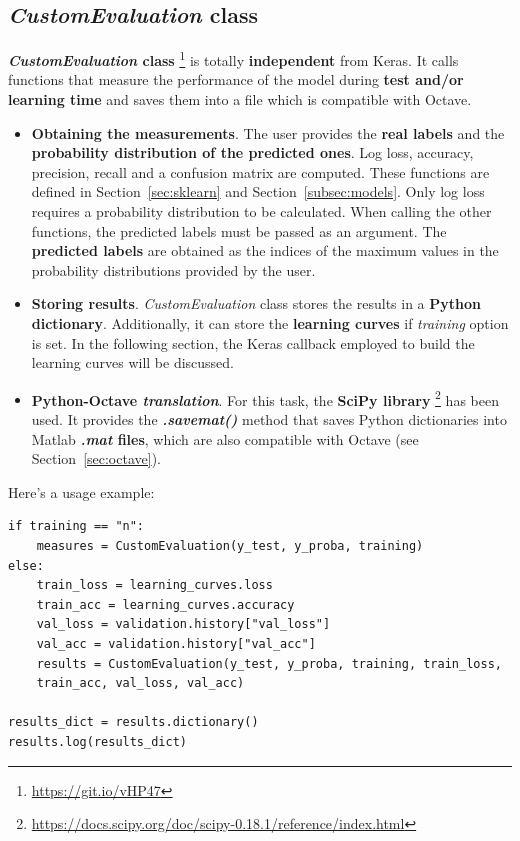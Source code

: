 \subsection{\textit{CustomEvaluation} class}
\textbf{\textit{CustomEvaluation} class} \footnote{\url{https://git.io/vHP47}} is totally \textbf{independent} from Keras. It calls functions that measure the performance of the model during \textbf{test and/or learning time} and saves them into a file which is compatible with Octave.
\begin{itemize}
	\item \textbf{Obtaining the measurements}. The user provides the \textbf{real labels} and the \textbf{probability distribution of the predicted ones}. Log loss, accuracy, precision, recall and a confusion matrix are computed. These functions are defined in Section~\ref{sec:sklearn} and Section~\ref{subsec:models}. Only log loss requires a probability distribution to be calculated. When calling the other functions, the predicted labels must be passed as an argument. The \textbf{predicted labels} are obtained as the indices of the maximum values in the probability distributions provided by the user.
	\item \textbf{Storing results}. \textit{CustomEvaluation} class stores the results in a \textbf{Python dictionary}. Additionally, it can store the \textbf{learning curves} if \textit{training} option is set. In the following section, the Keras callback employed to build the learning curves will be discussed.
	\item \textbf{Python-Octave \textit{translation}}. For this task, the \textbf{SciPy library} \footnote{\url{https://docs.scipy.org/doc/scipy-0.18.1/reference/index.html}} has been used. It provides the \textbf{\textit{.savemat()}} method that saves Python dictionaries into Matlab \textbf{\textit{.mat} files}, which are also compatible with Octave (see Section~\ref{sec:octave}).
\end{itemize}

Here's a usage example:
\begin{lstlisting}
if training == "n":
	measures = CustomEvaluation(y_test, y_proba, training)
else:
	train_loss = learning_curves.loss
	train_acc = learning_curves.accuracy
	val_loss = validation.history["val_loss"]
	val_acc = validation.history["val_acc"]
	results = CustomEvaluation(y_test, y_proba, training, train_loss,
	train_acc, val_loss, val_acc)

results_dict = results.dictionary()
results.log(results_dict)
\end{lstlisting}

